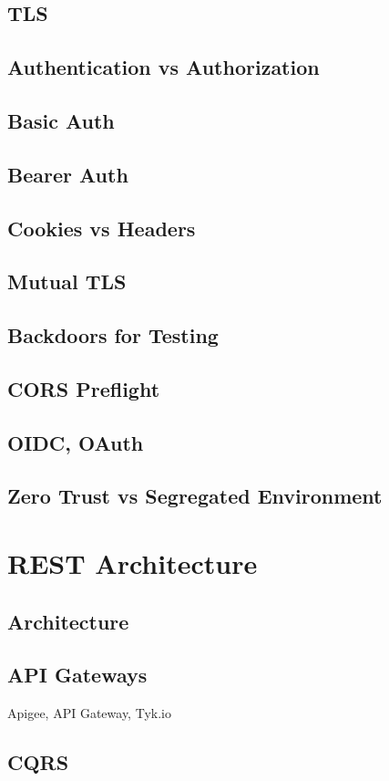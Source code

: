 \documentclass[12pt,oneside]{book} %
\begin{document}
\section{TLS}
\section{Authentication vs Authorization}
\section{Basic Auth}
\section{Bearer Auth}
\section{Cookies vs Headers}
\section{Mutual TLS}
\section{Backdoors for Testing}
\section{CORS Preflight}
\section{OIDC, OAuth}
\section{Zero Trust vs Segregated Environment}

\chapter{REST Architecture}
\section{Architecture}
\section{API Gateways}
Apigee, API Gateway, Tyk.io
\section{CQRS}
\end{document}
